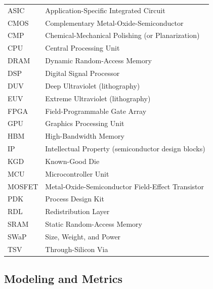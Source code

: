 \begin{tabular}{@{}l l@{}}
ASIC    & Application-Specific Integrated Circuit \\
CMOS    & Complementary Metal-Oxide-Semiconductor \\
CMP     & Chemical-Mechanical Polishing (or Planarization) \\
CPU     & Central Processing Unit \\
DRAM    & Dynamic Random-Access Memory \\
DSP     & Digital Signal Processor \\
DUV     & Deep Ultraviolet (lithography) \\
EUV     & Extreme Ultraviolet (lithography) \\
FPGA    & Field-Programmable Gate Array \\
GPU     & Graphics Processing Unit \\
HBM     & High-Bandwidth Memory \\
IP      & Intellectual Property (semiconductor design blocks) \\
KGD     & Known-Good Die \\
MCU     & Microcontroller Unit \\
MOSFET  & Metal-Oxide-Semiconductor Field-Effect Transistor \\
PDK     & Process Design Kit \\
RDL     & Redistribution Layer \\
SRAM    & Static Random-Access Memory \\
SWaP    & Size, Weight, and Power \\
TSV     & Through-Silicon Via \\
\end{tabular}

\subsection*{Modeling and Metrics}

